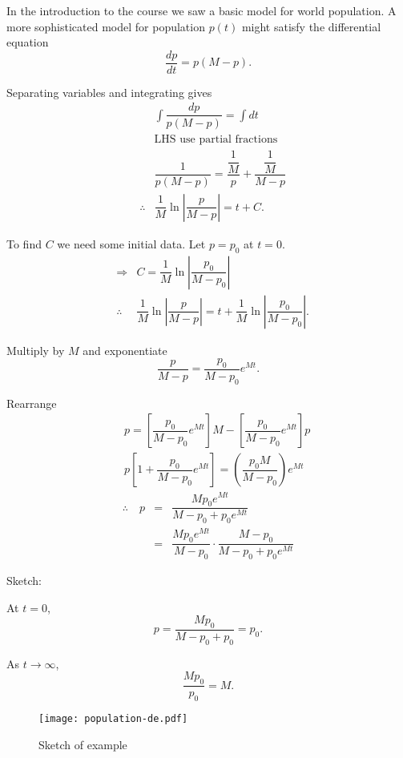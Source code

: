 \begin{example}
In the introduction to the course we saw a basic model for world population.  A more sophisticated model for population $p(t)$ might satisfy the differential equation
\[
\dfrac{dp}{dt}  = p(M-p).
\]

Separating variables and integrating gives
\begin{eqnarray*}
&& \int \dfrac{dp}{p(M-p)}  =  \int dt \\
& &\text{LHS use partial fractions} \\
&& \dfrac{1}{p(M-p)}  =  \dfrac{\dfrac{1}{M}}{p} +
\dfrac{\dfrac{1}{M}}{M-p} \\
&\therefore & \dfrac{1}{M} \ln \left|\dfrac{p}{M-p}\right|
 =  t + C.
\end{eqnarray*}

To find $C$ we need some initial data. Let $p=p_0$ at $t=0$.
\begin{eqnarray*}
&\Rightarrow  & C  =  \dfrac{1}{M} \ln \left|\dfrac{p_0}{M-p_0}\right| \\
&\therefore & \dfrac{1}{M} \ln \left|\dfrac{p}{M-p}\right|
 =  t + \dfrac{1}{M} \ln \left|\dfrac{p_0}{M-p_0}\right|.
\end{eqnarray*}

Multiply by $M$ and exponentiate
\[
\frac{p}{M-p}  =  \dfrac{p_0}{M-p_0} e^{Mt}.
\]

Rearrange
\begin{eqnarray*}
&& p  =  \left[ \dfrac{p_0}{M-p_0} e^{Mt}\right] M - \left[
\dfrac{p_0}{M-p_0} e^{Mt}\right]p \\
&& p\left[1 + \dfrac{p_0}{M-p_0} e^{Mt}\right] = \left( \dfrac{p_0
M}{M-p_0}\right) e^{Mt}
\end{eqnarray*}
\begin{eqnarray*}
\therefore \quad  p  &=&  \dfrac{M p_0 e^{Mt}}{M-p_0+p_0 e^{Mt}}\\
&=&  \dfrac{M p_0 e^{Mt}}{M-p_0} \cdot  \dfrac{M - p_0}{M-p_0+p_0 e^{Mt}}
\end{eqnarray*}

Sketch:

At $t=0$, 
\[
p = \dfrac{M p_0}{M - p_0 + p_0}=p_0.
\]

As $t \to \infty$,
\[
 \dfrac{Mp_0}{p_0} = M.
\]

\begin{figure}[H]
\centering
\texttt{[image: population-de.pdf]}
\caption{Sketch of example}
\label{populationde}
\end{figure}

\end{example}



